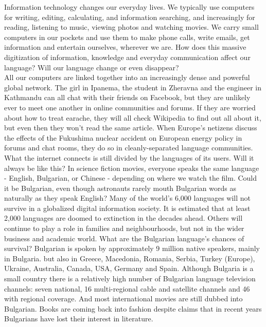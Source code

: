   \begin{multicols}{2}

Information technology changes our everyday lives. We typically use computers for writing, editing, calculating, and information searching, and increasingly for reading, listening to music, viewing photos and watching movies. We carry small computers in our pockets and use them to make phone calls, write emails, get information and entertain ourselves, wherever we are. How does this massive digitization of information, knowledge and everyday communication affect our language? Will our language change or even disappear?\\
All our computers are linked together into an increasingly dense and powerful global network. The girl in Ipanema, the student in Zheravna and the engineer in Kathmandu can all chat with their friends on Facebook, but they are unlikely ever to meet one another in online communities and forums. If they are worried about how to treat earache, they will all check Wikipedia to find out all about it, but even then they won’t read the same article. When Europe's netizens discuss the effects of the Fukushima nuclear accident on European energy policy in forums and chat rooms, they do so in cleanly-separated language communities. What the internet connects is still divided by the languages of its users. Will it always be like this? 
In science fiction movies, everyone speaks the same language - English, Bulgarian, or Chinese - depending on where we watch the film. Could it be Bulgarian, even though astronauts rarely mouth Bulgarian words as naturally as they speak English? Many of the world’s 6,000 languages will not survive in a globalized digital information society. It is estimated that at least 2,000 languages are doomed to extinction in the decades ahead. Others will continue to play a role in families and neighbourhoods, but not in the wider business and academic world. What are the Bulgarian language’s chances of survival? 
Bulgarian is spoken by approximately 9 million native speakers, mainly in Bulgaria. but also in Greece, Macedonia, Romania, Serbia, Turkey (Europe), Ukraine, Australia, Canada, USA, Germany and Spain. Although Bulgaria is a small country there is a relatively high number of Bulgarian language television channels: seven national, 16 multi-regional cable and satellite channels and 46 with regional coverage. And most international movies are still dubbed into Bulgarian. Books are coming back into fashion despite claims that in recent years Bulgarians have lost their interest in literature.

\end{multicols}

